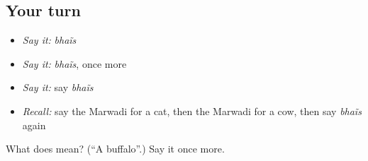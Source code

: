\subsection*{Your turn}
\begin{itemize}
\raggedright
  \item \emph{Say it:} \emph{bhaĩs}
  \item \emph{Say it:} \emph{bhaĩs}, once more
  \item \emph{Say it:} say \emph{bhaĩs}
  \item \emph{Recall:} say the Marwadi for a cat, then the Marwadi for a cow, then say \emph{bhaĩs} again
\end{itemize}

\begin{tcolorbox}[breakable,colback=teal!4,colframe=teal!35!black,title={Before you move on}]
What does  mean? (\textquotedblleft{}A buffalo\textquotedblright{}.) Say it once more.
\end{tcolorbox}
